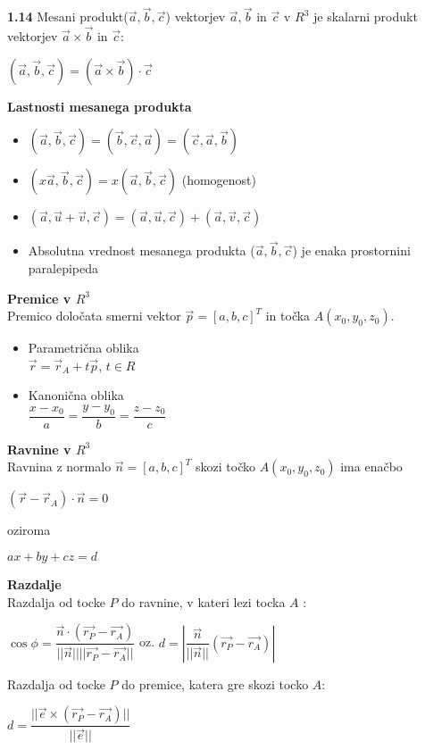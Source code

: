 \documentclass{article}
\begin{document}
\begin{multicols}{4}
\textbf{1.14} Mesani produkt($\vec{a}, \vec{b}, \vec{c}$) vektorjev
$\vec{a}, \vec{b}$ in $\vec{c}$ v $R^{3}$ je skalarni produkt vektorjev
$\vec{a} \times \vec{b}$ in $\vec{c}$:
\begin{center}
    $(\vec{a}, \vec{b}, \vec{c}) = (\vec{a} \times \vec{b})\cdot \vec{c}$
\end{center}

\textbf{Lastnosti mesanega produkta}
\begin{itemize}
    \item $(\vec{a}, \vec{b}, \vec{c}) = (\vec{b}, \vec{c}, \vec{a}) = (\vec{c}, \vec{a}, \vec{b})$
    \item $(x\vec{a}, \vec{b}, \vec{c}) = x(\vec{a}, \vec{b}, \vec{c})$ (homogenost)
    \item $(\vec{a}, \vec{u} + \vec{v}, \vec{c}) = (\vec{a}, \vec{u}, \vec{c}) + (\vec{a}, \vec{v}, \vec{c})$
    \item Absolutna vrednost mesanega produkta ($\vec{a}, \vec{b}, \vec{c}$) je enaka prostornini paralepipeda
\end{itemize}
    
\textbf{Premice v $R^{3}$} \\
Premico določata smerni vektor $\vec{p} = [a, b, c]^{T}$ in točka $A(x_0, y_0, z_0)$.
\begin{itemize}
    \item Parametrična oblika\\
        $\vec{r} = \vec{r}_{A} + t\vec{p}$, $t \in R$
    \vfill\null
    \columnbreak
    \item Kanonična oblika\\
        $\dfrac{x - x_{0}}{a} = \dfrac{y - y_{0}}{b} = \dfrac{z - z_{0}}{c}$
\end{itemize}

\textbf{Ravnine v $R^{3}$} \\
Ravnina z normalo $\vec{n} = [a, b, c]^T$ skozi točko $A(x_0, y_0, z_0)$ ima enačbo
\begin{center}
    $(\vec{r} - \vec{r}_A) \cdot \vec{n} = 0$
\end{center}
oziroma
\begin{center}
    $ax + by + cz = d$
\end{center}

\textbf{Razdalje}\\
Razdalja od tocke $P$ do ravnine, v kateri lezi tocka $A$ :
\begin{center}
    $\cos\phi = \dfrac{\vec{n} \cdot ( \vec{r_{P}} - \vec{r_{A}})} {||\vec{n}|| ||\vec{r_{P}} - \vec{r_{A}}||}$ oz.
    $d = |\dfrac{\vec{n}}{||\vec{n}||} ( \vec{r_{P}} - \vec{r_{A}})|$
\end{center}
Razdalja od tocke $P$ do premice, katera gre skozi tocko $A$:
\begin{center}
    $d = \dfrac{||\vec{e} \times ( \vec{r_{P}} - \vec{r_{A}})||}{||\vec{e}||}$
\end{center}


\end{multicols}
\end{document}
